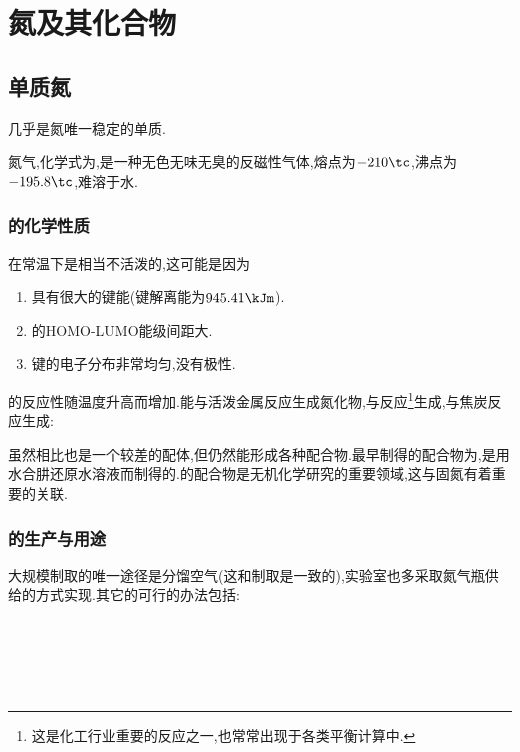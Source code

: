 \documentclass{ctexart}
\begin{document}
\section{氮及其化合物}
\subsection{单质氮}
几乎是氮唯一稳定的单质.
\begin{substance}[\ce{N2}]
    氮气,化学式为,是一种无色无味无臭的反磁性气体,熔点为$-210\tc$,沸点为$-195.8\tc$,难溶于水.
\end{substance}
\subsubsection{的化学性质}
在常温下是相当不活泼的,这可能是因为
\begin{enumerate}[label=\tbf{\arabic*.},topsep=0pt,parsep=0pt,itemsep=0pt,partopsep=0pt]
    \item {}具有很大的键能(键解离能为$945.41\kJm$).
    \item {}的HOMO-LUMO能级间距大.
    \item {}键的电子分布非常均匀,没有极性.
\end{enumerate}
的反应性随温度升高而增加.能与活泼金属反应生成氮化物,与反应\footnote{这是化工行业重要的反应之一,也常常出现于各类平衡计算中.}生成,与焦炭反应生成:
\begin{center}
\end{center}
虽然相比也是一个较差的配体,但仍然能形成各种配合物.最早制得的配合物为,是用水合肼还原水溶液而制得的.的配合物是无机化学研究的重要领域,这与固氮有着重要的关联.
\subsubsection{的生产与用途}
大规模制取的唯一途径是分馏空气(这和制取是一致的),实验室也多采取氮气瓶供给的方式实现.其它的可行的办法包括:
\begin{center}
    \\
    \\
    \\
    \\
\end{center}
\end{document}
